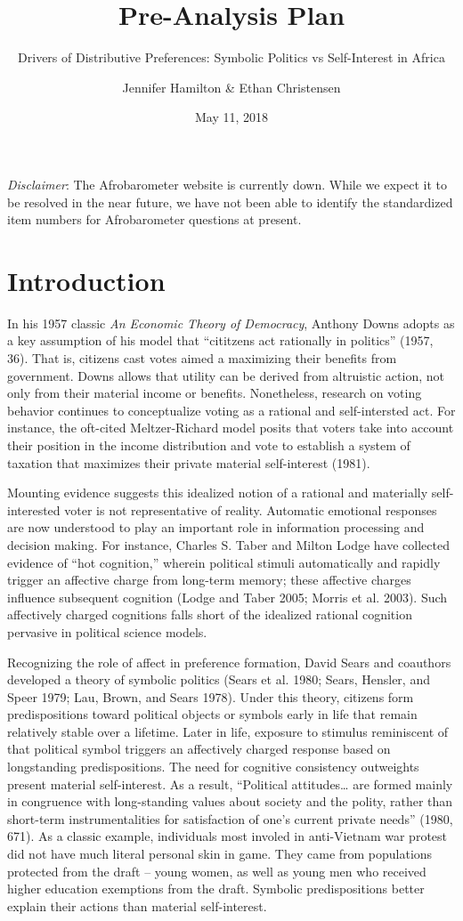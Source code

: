 \documentclass[]{article}
\title{Pre-Analysis Plan}
\subtitle{Drivers of Distributive Preferences: Symbolic Politics vs Self-Interest
in Africa}
\author{Jennifer Hamilton \& Ethan Christensen}
\date{May 11, 2018}
\begin{document}
\maketitle

\textit{Disclaimer}: The Afrobarometer website is currently down. While
we expect it to be resolved in the near future, we have not been able to
identify the standardized item numbers for Afrobarometer questions at
present.

\section{Introduction}\label{introduction}

In his 1957 classic \textit{An Economic Theory of Democracy}, Anthony
Downs adopts as a key assumption of his model that ``cititzens act
rationally in politics'' (1957, 36). That is, citizens cast votes aimed
a maximizing their benefits from government. Downs allows that utility
can be derived from altruistic action, not only from their material
income or benefits. Nonetheless, research on voting behavior continues
to conceptualize voting as a rational and self-intersted act. For
instance, the oft-cited Meltzer-Richard model posits that voters take
into account their position in the income distribution and vote to
establish a system of taxation that maximizes their private material
self-interest (1981).

Mounting evidence suggests this idealized notion of a rational and
materially self-interested voter is not representative of reality.
Automatic emotional responses are now understood to play an important
role in information processing and decision making. For instance,
Charles S. Taber and Milton Lodge have collected evidence of ``hot
cognition,'' wherein political stimuli automatically and rapidly trigger
an affective charge from long-term memory; these affective charges
influence subsequent cognition (Lodge and Taber 2005; Morris et al.
2003). Such affectively charged cognitions falls short of the idealized
rational cognition pervasive in political science models.

Recognizing the role of affect in preference formation, David Sears and
coauthors developed a theory of symbolic politics (Sears et al. 1980;
Sears, Hensler, and Speer 1979; Lau, Brown, and Sears 1978). Under this
theory, citizens form predispositions toward political objects or
symbols early in life that remain relatively stable over a lifetime.
Later in life, exposure to stimulus reminiscent of that political symbol
triggers an affectively charged response based on longstanding
predispositions. The need for cognitive consistency outweights present
material self-interest. As a result, ``Political attitudes\ldots{} are
formed mainly in congruence with long-standing values about society and
the polity, rather than short-term instrumentalities for satisfaction of
one's current private needs'' (1980, 671). As a classic example,
individuals most involed in anti-Vietnam war protest did not have much
literal personal skin in game. They came from populations protected from
the draft -- young women, as well as young men who received higher
education exemptions from the draft. Symbolic predispositions better
explain their actions than material self-interest.
\end{document}
